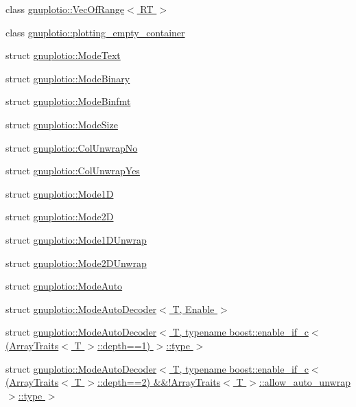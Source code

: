 \begin{DoxyCompactItemize}
\item 
class \hyperlink{classgnuplotio_1_1_vec_of_range}{gnuplotio\+::\+Vec\+Of\+Range$<$ R\+T $>$}
\item 
class \hyperlink{classgnuplotio_1_1plotting__empty__container}{gnuplotio\+::plotting\+\_\+empty\+\_\+container}
\item 
struct \hyperlink{structgnuplotio_1_1_mode_text}{gnuplotio\+::\+Mode\+Text}
\item 
struct \hyperlink{structgnuplotio_1_1_mode_binary}{gnuplotio\+::\+Mode\+Binary}
\item 
struct \hyperlink{structgnuplotio_1_1_mode_binfmt}{gnuplotio\+::\+Mode\+Binfmt}
\item 
struct \hyperlink{structgnuplotio_1_1_mode_size}{gnuplotio\+::\+Mode\+Size}
\item 
struct \hyperlink{structgnuplotio_1_1_col_unwrap_no}{gnuplotio\+::\+Col\+Unwrap\+No}
\item 
struct \hyperlink{structgnuplotio_1_1_col_unwrap_yes}{gnuplotio\+::\+Col\+Unwrap\+Yes}
\item 
struct \hyperlink{structgnuplotio_1_1_mode1_d}{gnuplotio\+::\+Mode1D}
\item 
struct \hyperlink{structgnuplotio_1_1_mode2_d}{gnuplotio\+::\+Mode2D}
\item 
struct \hyperlink{structgnuplotio_1_1_mode1_d_unwrap}{gnuplotio\+::\+Mode1\+D\+Unwrap}
\item 
struct \hyperlink{structgnuplotio_1_1_mode2_d_unwrap}{gnuplotio\+::\+Mode2\+D\+Unwrap}
\item 
struct \hyperlink{structgnuplotio_1_1_mode_auto}{gnuplotio\+::\+Mode\+Auto}
\item 
struct \hyperlink{structgnuplotio_1_1_mode_auto_decoder}{gnuplotio\+::\+Mode\+Auto\+Decoder$<$ T, Enable $>$}
\item 
struct \hyperlink{structgnuplotio_1_1_mode_auto_decoder_3_01_t_00_01typename_01boost_1_1enable__if__c_3_07_array_t1ec50a546e6580c42fe67da3e27f4154}{gnuplotio\+::\+Mode\+Auto\+Decoder$<$ T, typename boost\+::enable\+\_\+if\+\_\+c$<$(\+Array\+Traits$<$ T $>$\+::depth==1) $>$\+::type $>$}
\item 
struct \hyperlink{structgnuplotio_1_1_mode_auto_decoder_3_01_t_00_01typename_01boost_1_1enable__if__c_3_07_array_t40de9ad20cf29b501e884c0f76d7ac36}{gnuplotio\+::\+Mode\+Auto\+Decoder$<$ T, typename boost\+::enable\+\_\+if\+\_\+c$<$(\+Array\+Traits$<$ T $>$\+::depth==2) \&\&!\+Array\+Traits$<$ T $>$\+::allow\+\_\+auto\+\_\+unwrap $>$\+::type $>$}
\item 

\end{DoxyCompactItemize}
